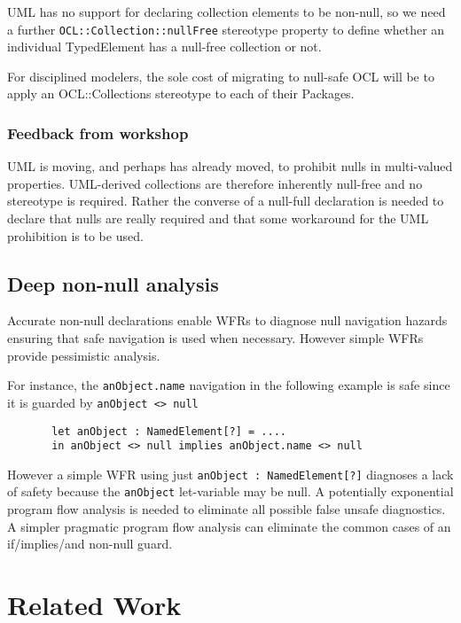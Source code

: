 \documentclass{llncs}
\begin{document}
UML has no support for declaring collection elements to be non-null, so we need a further \verb$OCL::Collection::nullFree$ stereotype property to define whether an individual TypedElement has a null-free collection or not.

For disciplined modelers, the sole cost of migrating to null-safe OCL will be to apply an OCL::Collections stereotype to each of their Packages.

\subsubsection{Feedback from workshop}

UML is moving, and perhaps has already moved, to prohibit nulls in multi-valued properties. UML-derived collections are therefore inherently null-free and no stereotype is required. Rather the converse of a null-full declaration is needed to declare that nulls are really required and that some workaround for the UML prohibition is to be used.

\subsection{Deep non-null analysis}

Accurate non-null declarations enable WFRs to diagnose null navigation hazards ensuring that safe navigation is used when necessary. However simple WFRs provide pessimistic analysis.

For instance, the \verb$anObject.name$ navigation in the following example is safe since it is guarded by \verb$anObject <> null$

\begin{verbatim}
       let anObject : NamedElement[?] = .... 
       in anObject <> null implies anObject.name <> null
\end{verbatim}

However a simple WFR using just \verb$anObject : NamedElement[?]$ diagnoses a lack of safety because the \verb$anObject$ let-variable may be null. A potentially exponential program flow analysis is needed to eliminate all possible false unsafe diagnostics. A simpler pragmatic program flow analysis can eliminate the common cases of an if/implies/and non-null guard.

\section{Related Work}\label{Related Work}
\end{document}
